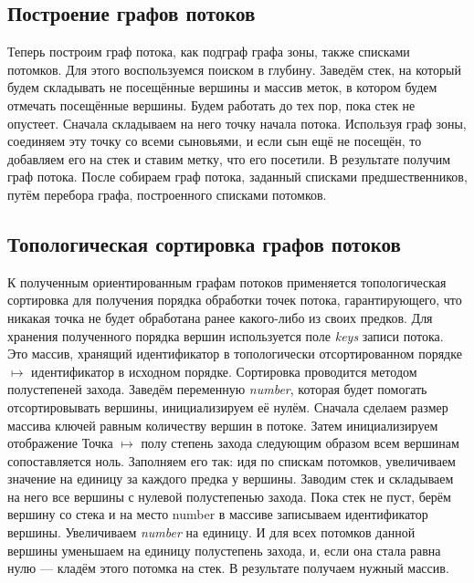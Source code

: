 \documentclass[12pt]{article}
\theoremstyle{plain}
\begin{document}
\subsection{Построение графов потоков}

Теперь построим граф потока, как подграф графа зоны, также списками потомков. Для этого воспользуемся поиском в глубину. Заведём стек, на который будем складывать не посещённые вершины и массив меток, в котором будем отмечать посещённые вершины. Будем работать до тех пор, пока стек не опустеет. Сначала складываем на него точку начала потока. Используя граф зоны, соединяем эту точку со всеми сыновьями, и если сын ещё не посещён, то добавляем его на стек и ставим метку, что его посетили. В результате получим граф потока. После собираем граф потока, заданный списками предшественников, путём перебора графа, построенного списками потомков.



\subsection{Топологическая сортировка графов потоков}
\label{sec:TopSort}

К полученным ориентированным графам потоков применяется топологическая сортировка для получения порядка обработки точек потока, гарантирующего, что никакая точка не будет обработана ранее какого-либо из своих предков. Для хранения полученного порядка вершин используется поле \textit{keys} записи потока. Это массив, хранящий идентификатор в топологически отсортированном порядке $\mapsto$ идентификатор в исходном порядке. Сортировка проводится методом полустепеней захода. Заведём переменную \textit{number}, которая будет помогать отсортировывать вершины, инициализируем её нулём. Сначала сделаем размер массива ключей равным количеству вершин в потоке. Затем инициализируем отображение Точка $\mapsto$ полу степень захода следующим образом всем вершинам сопоставляется ноль. Заполняем его так: идя по спискам потомков, увеличиваем значение на единицу за каждого предка у вершины. Заводим стек и складываем на него все вершины с нулевой полустепенью захода. Пока стек не пуст, берём вершину со стека и на место number в массиве записываем идентификатор вершины. Увеличиваем \textit{number} на единицу. И для всех потомков данной вершины уменьшаем на единицу полустепень захода, и, если она стала равна нулю --- кладём этого потомка на стек. В результате получаем нужный массив.
\end{document}
